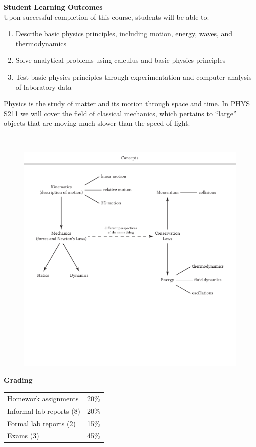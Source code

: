 \documentclass[11pt,letterpaper]{article}
\newcommand{\squeezeup}{\vspace{-2.5mm}}
\begin{document}
\textbf{Student Learning Outcomes}\\
Upon successful completion of this course, students will be able to:
\begin{enumerate}\itemsep -5pt
\item Describe basic physics principles, including motion, energy, waves, and thermodynamics
\item Solve analytical problems using calculus and basic physics principles
\item Test basic physics principles through experimentation and computer analysis of laboratory data
\end{enumerate}\bigskip

\clearpage
Physics is the study of matter and its motion through space and time. In PHYS S211 we will cover the field of classical mechanics, which pertains to ``large'' objects that are moving much slower than the speed of light.

\bigskip
\
\begin{figure}[h]
\begin{center}
\includegraphics[width=6.5in]{./flowchart.pdf}
\end{center}
\end{figure}

\clearpage
\textbf{Grading} 
\begin{table}[h!]
\squeezeup
\begin{tabular}{ll}
Homework assignments & 20\%\\
Informal lab reports (8) & 20\%\\
Formal lab reports (2) & 15\%\\
Exams (3) & 45\%
\end{tabular}
\end{table}
\end{document}
